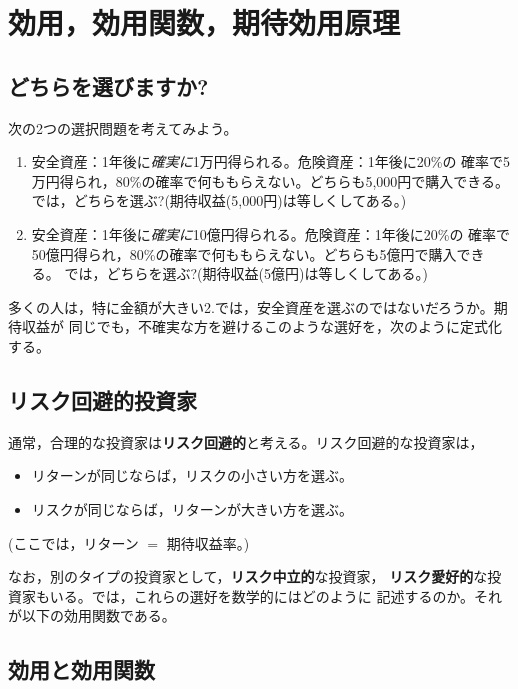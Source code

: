 \vspace{18pt}

\section{効用，効用関数，期待効用原理}

\subsection{どちらを選びますか?}

次の2つの選択問題を考えてみよう。

\begin{enumerate}
\item 安全資産：1年後に\emph{確実に}1万円得られる。危険資産：1年後に20\%の
確率で5万円得られ，80\%の確率で何ももらえない。どちらも5,000円で購入できる。
では，どちらを選ぶ?(期待収益(5,000円)は等しくしてある。)
\item 安全資産：1年後に\emph{確実に}10億円得られる。危険資産：1年後に20\%の
確率で50億円得られ，80\%の確率で何ももらえない。どちらも5億円で購入できる。
では，どちらを選ぶ?(期待収益(5億円)は等しくしてある。)
\end{enumerate}

多くの人は，特に金額が大きい2.では，安全資産を選ぶのではないだろうか。期待収益が
同じでも，不確実な方を避けるこのような選好を，次のように定式化する。

\subsection{リスク回避的投資家}

\begin{keypoint}[リスク回避的投資家]
通常，合理的な投資家は\textbf{リスク回避的}と考える。リスク回避的な投資家は，
\begin{itemize}
\item リターンが同じならば，リスクの小さい方を選ぶ。
\item リスクが同じならば，リターンが大きい方を選ぶ。
\end{itemize}
(ここでは，リターン $=$ 期待収益率。)
\end{keypoint}

なお，別のタイプの投資家として，\textbf{リスク中立的}な投資家，
\textbf{リスク愛好的}な投資家もいる。では，これらの選好を数学的にはどのように
記述するのか。それが以下の効用関数である。

\subsection{効用と効用関数}

